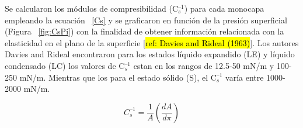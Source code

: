 {Se calcularon los módulos de compresibilidad (C$_s^{\text{--}1}$) para cada monocapa empleando la ecuación ~\ref{Cs} y se graficaron en función de la presión superficial (Figura ~\ref{fig:CsPi}) con la finalidad de obtener información relacionada con la elasticidad en el plano de la superficie [\hl{ref: Davies and Rideal (1963)}]. Los autores Davies and Rideal encontraron para los estados líquido expandido (LE) y líquido condensado (LC) los valores de C$_s^{\text{--}1}$ estan en los rangos de 12.5-50 mN/m y 100-250 mN/m. Mientras que los para el estado sólido (S), el C$_s^{\text{--}1}$  varía entre 1000-2000 mN/m.

\begin{equation} 
    \label{Cs}
    C_s^{\text{--}1} = \frac{1}{A}\left(\frac{dA}{d\pi} \right)  
\end{equation}
%
%
%
%
%    
%
%
%
}
